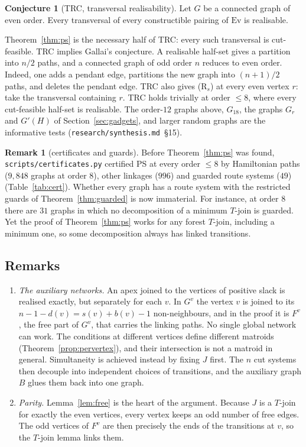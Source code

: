 \documentclass[11pt]{amsart}
\theoremstyle{definition}
\newtheorem*{remark*}{Remark}
\newtheorem*{conjecture*}{Conjecture}
\newcommand{\Ev}{\mathrm{Ev}}
\begin{document}
\begin{conjecture*}[TRC, transversal realisability]
Let $G$ be a connected graph of even order. Every transversal of every constructible pairing of $\Ev$
is realisable.
\end{conjecture*}

Theorem~\ref{thm:ps} is the necessary half of TRC: every such transversal is cut-feasible. TRC
implies Gallai's conjecture. A realisable half-set gives a partition into $n/2$ paths, and a
connected graph of odd order $n$ reduces to even order. Indeed, one adds a pendant edge, partitions
the new graph into $(n+1)/2$ paths, and deletes the pendant edge. TRC also gives (R$_s$) at every even
vertex $r$: take the transversal containing $r$. TRC holds trivially at order $\le8$, where every
cut-feasible half-set is realisable. The order-$12$ graphs above, $G_{18}$, the graphs $G_r$ and
$G'(H)$ of Section~\ref{sec:gadgets}, and larger random graphs are the informative tests
(\texttt{research/synthesis.md}~\S15).

\begin{remark*}[certificates and guards]
Before Theorem~\ref{thm:ps} was found, \texttt{scripts/certificates.py} certified PS at every order
$\le 8$ by Hamiltonian paths ($9{,}848$ graphs at order $8$), other linkages ($996$) and guarded
route systems ($49$) (Table~\ref{tab:cert}). Whether every graph has a route system with the
restricted guards of Theorem~\ref{thm:guarded} is now immaterial. For instance, at order $8$ there are $31$ graphs in which no decomposition of a minimum $T$-join is
guarded. Yet the proof of Theorem~\ref{thm:ps} works for any forest $T$-join, including a minimum one,
so some decomposition always has linked transitions.
\end{remark*}

\subsection{Remarks}
\begin{enumerate}
\item \emph{The auxiliary networks.} An apex joined to the vertices of positive slack is realised
exactly, but separately for each $v$. In $G^v$ the vertex $v$ is joined to its $n-1-d(v)=s(v)+b(v)-1$
non-neighbours, and in the proof it is $F^v$, the free part of $G^v$, that carries the linking paths.
No single global network can work. The conditions at different vertices define different matroids
(Theorem~\ref{prop:pervertex}), and their intersection is not a matroid in general. Simultaneity is
achieved instead by fixing $J$ first. The $n$ cut systems then decouple into independent choices of
transitions, and the auxiliary graph $B$ glues them back into one graph.
\item \emph{Parity.} Lemma~\ref{lem:free} is the heart of the argument. Because $J$ is a $T$-join for
exactly the even vertices, every vertex keeps an odd number of free edges. The odd vertices of $F^v$
are then precisely the ends of the transitions at $v$, so the $T$-join lemma links them.
\end{enumerate}
\end{document}
